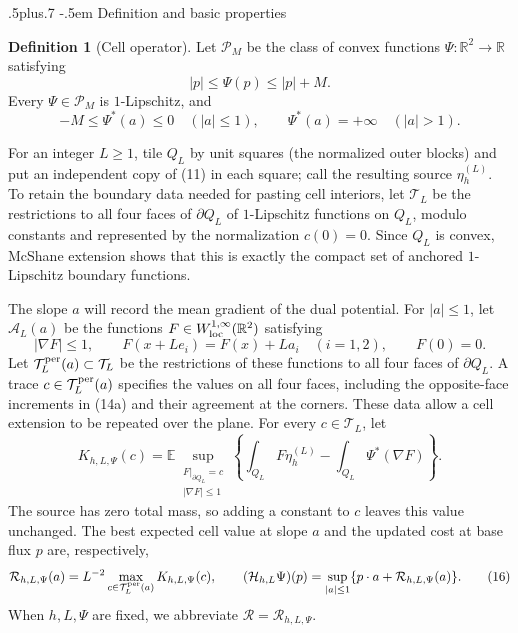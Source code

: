 \documentclass[11pt,reqno]{amsart}
\makeatletter
\def\subsection{\@startsection{subsection}{2}{0pt}%
  {.5\linespacing plus.7\linespacing}
  {-.5em}
  {\normalfont\scshape}}
\theoremstyle{plain}
\theoremstyle{definition}
\newtheorem{definition}[theorem]{Definition}
\theoremstyle{remark}
\numberwithin{equation}{section}
\newcommand{\1}{\mathbf 1}
\makeatother
\begin{document}
\subsection{Definition and basic properties}

\begin{definition}[Cell operator]\label{def:cell-operator}
Let $\mathscr P_ M$ be the class of convex functions
$\Psi:\mathbb R^2\to\mathbb R$ satisfying
\begin{equation}
|p|\leq\Psi(p)\leq |p|+M.
\tag{13}
\end{equation}
Every $\Psi\in\mathscr P_ M$ is $1$-Lipschitz, and
\begin{equation}
-M\leq\Psi^*(a)\leq0\quad (|a|\leq1),\qquad
\Psi^*(a)=+\infty\quad (|a|>1).
\tag{14}
\end{equation}

For an integer $L\geq1$, tile $Q_ L$ by unit squares (the normalized outer
blocks) and put an independent copy of (11) in each square; call the resulting
source $\eta_ h^{(L)}$.  To retain the boundary data needed for pasting
cell interiors, let
$\mathcal T_ L$ be the restrictions to all four faces of $\partial Q_ L$
of $1$-Lipschitz functions on $Q_ L$, modulo constants and represented
by the normalization $c(0)=0$.  Since $Q_ L$ is convex, McShane
extension shows that this is exactly the compact set of anchored
$1$-Lipschitz boundary functions.

The slope $a$ will record the mean gradient of the dual potential.
For $|a|\leq1$, let $\mathcal A_ L(a)$ be the functions
$F\in W^{1,\infty}_ {\rm loc}(\mathbb R^2)$ satisfying
\begin{equation}
|\nabla F|\leq1,\qquad
F(x+Le_ i)=F(x)+La_ i\quad(i=1,2),\qquad F(0)=0.
\tag{14a}
\end{equation}
Let $\mathcal T_ L^{\rm per}(a)\subset\mathcal T_ L$ be the restrictions
of these functions to all four faces of $\partial Q_ L$.  A trace
$c\in\mathcal T_ L^{\rm per}(a)$ specifies the values on all four faces,
including the opposite-face increments in (14a) and their agreement at
the corners.  These data allow a cell extension to be repeated over the
plane.  For every $c\in\mathcal T_ L$, let
\begin{equation}
K_ {h,L,\Psi}(c)=\mathbb E\sup_ {\substack{F|_ {\partial Q_ L}=c\\
|\nabla F|\leq1}}
\left\{\int_ {Q_ L}F\eta_ h^{(L)}
-\int_ {Q_ L}\Psi^*(\nabla F)\right\}.
\tag{15}
\end{equation}
The source has zero total mass, so adding a constant to $c$ leaves this
value unchanged.  The best expected cell value at slope $a$ and the
updated cost at base flux $p$ are, respectively,
\begin{equation}
\mathcal R_ {h,L,\Psi}(a)=L^{-2}
\max_ {c\in\mathcal T_ L^{\rm per}(a)}K_ {h,L,\Psi}(c),\qquad
(\mathcal H_ {h,L}\Psi)(p)
=\sup_ {|a|\leq1}\{p\cdot a+\mathcal R_ {h,L,\Psi}(a)\}.
\tag{16}
\end{equation}
When $h,L,\Psi$ are fixed, we abbreviate
$\mathcal R=\mathcal R_{h,L,\Psi}$.


\end{definition}
\end{document}
